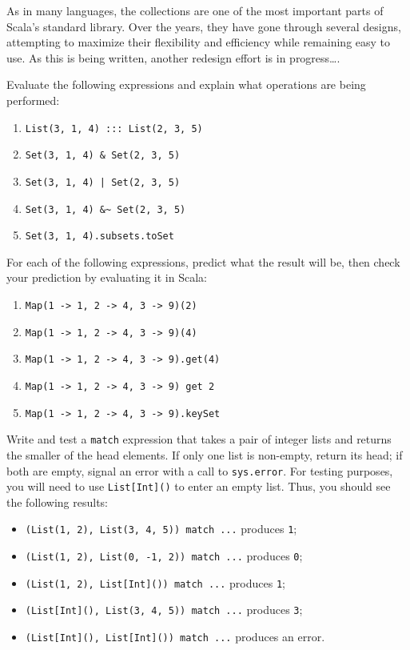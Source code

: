 \begin{tailquote}
As in many languages, the collections are one of the most important parts of Scala's standard library. Over the years, they have gone through several designs, attempting to maximize their flexibility and efficiency while remaining easy to use. As this is being written, another redesign effort is in progress\ldots.
\end{tailquote}
\begin{exercises}
\item Evaluate the following expressions and explain what operations are being performed:
\begin{enumerate}
\item \verb|List(3, 1, 4) ::: List(2, 3, 5)|
\item \verb|Set(3, 1, 4) & Set(2, 3, 5)|
\item \verb-Set(3, 1, 4) | Set(2, 3, 5)-
\item \verb|Set(3, 1, 4) &~ Set(2, 3, 5)|
\item \verb|Set(3, 1, 4).subsets.toSet|
\end{enumerate}

\item For each of the following expressions, predict what the result will be, then check your prediction by evaluating it in Scala:
\begin{enumerate}
\item \verb|Map(1 -> 1, 2 -> 4, 3 -> 9)(2)|
\item \verb|Map(1 -> 1, 2 -> 4, 3 -> 9)(4)|
\item \verb|Map(1 -> 1, 2 -> 4, 3 -> 9).get(4)|
\item \verb|Map(1 -> 1, 2 -> 4, 3 -> 9) get 2|
\item \verb|Map(1 -> 1, 2 -> 4, 3 -> 9).keySet|
\end{enumerate}

\item Write and test a \texttt{match} expression that takes a pair of integer lists and returns the smaller of the head elements. If only one list is non-empty, return its head; if both are empty, signal an error with a call to \texttt{sys.error}. For testing purposes, you will need to use \verb|List[Int]()| to enter an empty list. Thus, you should see the following results:
\begin{itemize}
\item \verb|(List(1, 2), List(3, 4, 5)) match ...| produces \texttt{1};
\item \verb|(List(1, 2), List(0, -1, 2)) match ...| produces \texttt{0};
\item \verb|(List(1, 2), List[Int]()) match ...| produces \texttt{1};
\item \verb|(List[Int](), List(3, 4, 5)) match ...| produces \texttt{3};
\item \verb|(List[Int](), List[Int]()) match ...| produces an error.
\end{itemize} 
\end{exercises}

